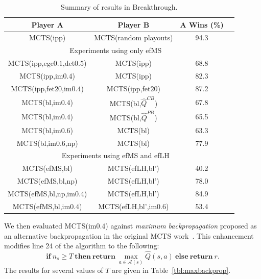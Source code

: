\documentclass[conference]{IEEEtran}
\newcommand{\cA}{\mathcal{A}}
\newcommand{\hQ}{\hat{Q}}
\begin{document}
\begin{table}[t]
\begin{center}
\begin{tabular}{|c|c|c|c|}
\hline
{\bf Player A}              & {\bf Player B}         & {\bf A Wins} (\%)  \\
\hline
MCTS(ipp)                   & MCTS(random playouts)  & 94.3               \\
\hline 
\hline 
\multicolumn{3}{|c|}{Experiments using only efMS}  \\ 
\hline
MCTS(ipp,ege$0.1$,det$0.5$) & MCTS(ipp)              & 68.8               \\
MCTS(ipp,im$0.4$)           & MCTS(ipp)              & 82.3               \\ 
MCTS(ipp,fet$20$,im$0.4$)   & MCTS(ipp,fet$20$)      & 87.2               \\
MCTS(bl,im$0.4$)            & MCTS(bl,$\hQ^{CB}$)    & 67.8               \\
MCTS(bl,im$0.4$)            & MCTS(bl,$\hQ^{PB}$)    & 65.5               \\
MCTS(bl,im$0.6$)            & MCTS(bl)               & 63.3               \\
MCTS(bl,im$0.6$,np)         & MCTS(bl)               & 77.9               \\
\hline
\hline
\multicolumn{3}{|c|}{Experiments using efMS and efLH}  \\ 
\hline
MCTS(efMS,bl)               & MCTS(efLH,bl')         & 40.2               \\
MCTS(efMS,bl,np)            & MCTS(efLH,bl')         & 78.0               \\
MCTS(efMS,bl,np,im$0.4$)    & MCTS(efLH,bl')         & 84.9               \\ 
MCTS(efMS,bl,im$0.4$)       & MCTS(efLH,bl',im$0.6$) & 53.4               \\
\hline
\end{tabular}
\end{center}
\caption{Summary of results in Breakthrough.}
\label{tbl:btsummary}
\end{table}


We then evaluated MCTS(im$0.4$) against {\it maximum backpropagation} proposed as an alternative 
backpropagation in the original MCTS work~\cite{Coulom06Efficient}. This enhancement
modifies line 24 of the algorithm to the following: 
\[
\mathbf{if}~n_{s} \ge T~\mathbf{then~return}~\max_{a \in \cA(s)} \hQ(s,a)~\mathbf{else~return}~r.
\]
The results for several values of $T$ are given in Table~\ref{tbl:maxbackprop}. 
\end{document}
